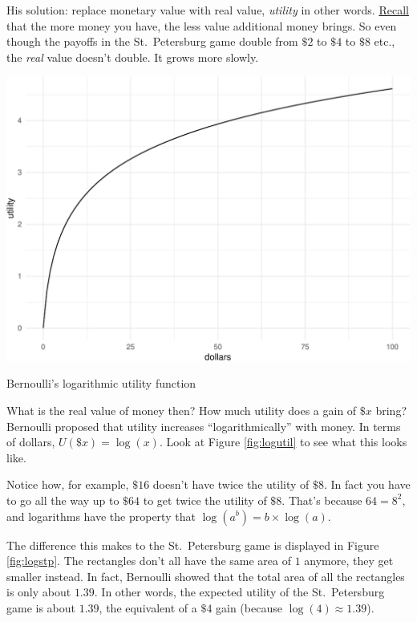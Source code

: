 \documentclass[justified]{tufte-book}
\renewcommand{\u}{U}
\theoremstyle{definition}
\theoremstyle{definition}
\theoremstyle{definition}
\theoremstyle{remark}
\begin{document}
His solution: replace monetary value with real value, \emph{utility} in
other words. \protect\hyperlink{utility}{Recall} that the more money you
have, the less value additional money brings. So even though the payoffs
in the St.~Petersburg game double from \(\$2\) to \(\$4\) to \(\$8\)
etc., the \emph{real} value doesn't double. It grows more slowly.

\begin{marginfigure}
\includegraphics{_main_files/figure-latex/logutil-1} \caption[Bernoulli's logarithmic utility function]{Bernoulli's logarithmic utility function}\label{fig:logutil}
\end{marginfigure}

What is the real value of money then? How much utility does a gain of
\(\$x\) bring? Bernoulli proposed that utility increases
``logarithmically'' with money. In terms of dollars,
\(\u(\$x)=\log(x)\). Look at Figure \ref{fig:logutil} to see what this
looks like.

Notice how, for example, \(\$16\) doesn't have twice the utility of
\(\$8\). In fact you have to go all the way up to \(\$64\) to get twice
the utility of \(\$8\). That's because \(64 = 8^2\), and logarithms have
the property that \(\log(a^b) = b \times \log(a)\).

The difference this makes to the St.~Petersburg game is displayed in
Figure \ref{fig:logstp}. The rectangles don't all have the same area of
\(1\) anymore, they get smaller instead. In fact, Bernoulli showed that
the total area of all the rectangles is only about \(1.39\). In other
words, the expected utility of the St.~Petersburg game is about
\(1.39\), the equivalent of a \(\$4\) gain (because
\(\log(4) \approx 1.39\)).
\end{document}
